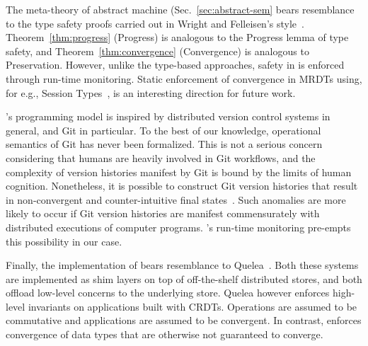 The meta-theory of \quark abstract machine
(Sec.~\ref{sec:abstract-sem} bears resemblance to the type safety
proofs carried out in Wright and Felleisen's style~\cite{WF92}.
Theorem~\ref{thm:progress} (Progress) is analogous to the Progress
lemma of type safety, and Theorem~\ref{thm:convergence} (Convergence)
is analogous to Preservation.  However, unlike the type-based
approaches, safety in \quark is enforced through run-time monitoring.
Static enforcement of convergence in MRDTs using, for e.g., Session
Types~\cite{HNMSession16}, is an interesting direction for future
work.

\quark's programming model is inspired by distributed version control
systems in general, and Git in particular. To the best of our
knowledge, operational semantics of Git has never been formalized.
This is not a serious concern considering that humans are heavily
involved in Git workflows, and the complexity of version histories
manifest by Git is bound by the limits of human cognition.
Nonetheless, it is possible to construct Git version histories that
result in non-convergent and counter-intuitive final
states~\cite{tycon,russell}. Such anomalies are more likely to occur
if Git version histories are manifest commensurately with distributed
executions of computer programs. \quark's run-time monitoring
pre-empts this possibility in our case.

Finally, the implementation of \quark bears resemblance to
Quelea~\cite{pldi15}. Both these systems are implemented as shim
layers on top of off-the-shelf distributed stores, and both offload
low-level concerns to the underlying store. Quelea however enforces
high-level invariants on applications built with CRDTs. Operations are
assumed to be commutative and applications are assumed to be
convergent. In contrast, \quark enforces convergence of data types
that are otherwise not guaranteed to converge.
